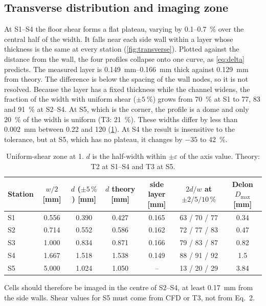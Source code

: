 \documentclass[11pt,a4paper]{article}
\begin{document}
\subsection{Transverse distribution and imaging zone}

At S1--S4 the floor shear forms a flat plateau, varying by 0.1--\SI{0.7}{\percent} over the central half of the width. It falls near each side wall within a layer whose thickness is the same at every station (\cref{fig:transverse}). Plotted against the distance from the wall, the four profiles collapse onto one curve, as \cref{eq:delta} predicts. The measured layer is \SIrange{0.149}{0.166}{mm} thick against \SI{0.129}{mm} from theory. The difference is below the spacing of the wall nodes, so it is not resolved. Because the layer has a fixed thickness while the channel widens, the fraction of the width with uniform shear ($\pm\SI{5}{\percent}$) grows from \SI{70}{\percent} at S1 to 77, 83 and \SI{91}{\percent} at S2--S4. At S5, which is the corner, the profile is a dome and only \SI{20}{\percent} of the width is uniform (T3: \SI{21}{\percent}). These widths differ by less than \SI{0.002}{mm} between 0.22 and \SI{120}{\uLmin} (\cref{tab:uniform}). At S4 the result is insensitive to the tolerance, but at S5, which has no plateau, it changes by $-35$ to \SI{+42}{\percent}.

\begin{table}[t]
\centering
\caption{Uniform-shear zone at \SI{1}{\uLmin}. $d$ is the half-width within $\pm\varepsilon$ of the axis value. Theory: T2 at S1--S4 and T3 at S5.}
\label{tab:uniform}
\small
\begin{tabular}{@{}lcccccc@{}}
\toprule
Station & $w/2$ [mm] & $d$ ($\pm5\,\%$) [mm] & $d$ theory [mm] & side layer [mm] & $2d/w$ at $\pm2/5/10\,\%$ & Delon $D_{\max}$ [mm]\\
\midrule
S1 & 0.556 & 0.390 & 0.427 & 0.165 & 63 / 70 / 77 & 0.34\\
S2 & 0.714 & 0.552 & 0.586 & 0.162 & 72 / 77 / 83 & 0.47\\
S3 & 1.000 & 0.834 & 0.871 & 0.166 & 79 / 83 / 87 & 0.82\\
S4 & 1.667 & 1.518 & 1.538 & 0.149 & 88 / 91 / 92 & 1.5\\
S5 & 5.000 & 1.024 & 1.050 & -- & 13 / 20 / 29 & 3.84\\
\bottomrule
\end{tabular}
\end{table} Cells should therefore be imaged in the centre of S2--S4, at least \SI{0.17}{mm} from the side walls. Shear values for S5 must come from CFD or T3, not from Eq.~2.
\end{document}
